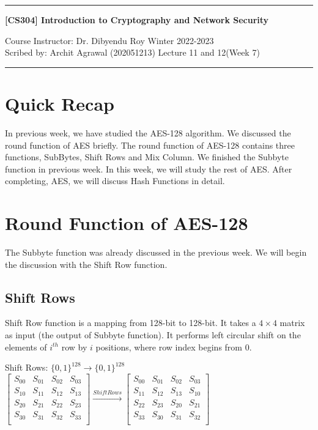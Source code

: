 \documentclass[11pt]{article}
\begin{document}
\noindent
\rule{\textwidth}{1pt}
\begin{center}
{\bf [CS304] Introduction to Cryptography and Network Security}
\end{center}
Course Instructor: Dr. Dibyendu Roy \hfill Winter 2022-2023\\
Scribed by: Archit Agrawal (202051213) \hfill Lecture 11 and 12(Week 7)
\\
\rule{\textwidth}{1pt}

\section{Quick Recap}
In previous week, we have studied the AES-128 algorithm. We discussed the round function of AES briefly. The round function of AES-128 contains three functions, SubBytes, Shift Rows and Mix Column. We finished the Subbyte function in previous week. In this week, we will study the rest of AES. After completing, AES, we will discuss Hash Functions in detail.

\section{Round Function of AES-128}
The Subbyte function was already discussed in the previous week. We will begin the discussion with the Shift Row function.

\subsection{Shift Rows}
Shift Row function is a mapping from 128-bit to 128-bit. It takes a $4 \times 4$ matrix as input (the output of Subbyte function). It performs left circular shift on the elements of $i^{th}$ row by $i$ positions, where row index begins from 0.
\begin{center}
    Shift Rows: $\{0, 1\}^{128} \rightarrow \{0, 1\}^{128}$\\
    \vspace{1mm}
    $
    \begin{bmatrix}
        S_{00} & S_{01} & S_{02} & S_{03}\\
        S_{10} & S_{11} & S_{12} & S_{13}\\
        S_{20} & S_{21} & S_{22} & S_{23}\\
        S_{30} & S_{31} & S_{32} & S_{33}\\
    \end{bmatrix}
    \xrightarrow{Shift Rows}
    \begin{bmatrix}
        S_{00} & S_{01} & S_{02} & S_{03}\\
        S_{11} & S_{12} & S_{13} & S_{10}\\
        S_{22} & S_{23} & S_{20} & S_{21}\\
        S_{33} & S_{30} & S_{31} & S_{32}\\
    \end{bmatrix}
    $
\end{center}
\end{document}
